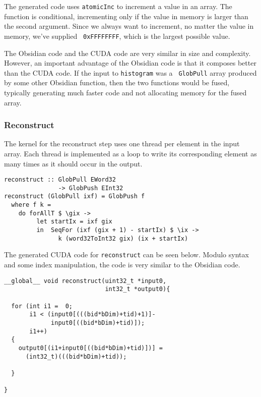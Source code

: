 The generated code uses \verb!atomicInc! to increment a value in an
array. The function is conditional, incrementing only if the value in
memory is larger than the second argument. Since we always want to
increment, no matter the value in memory, we've supplied {\tt
  0xFFFFFFFF}, which is the largest possible value.

The Obsidian code and the CUDA code are very similar in size and complexity. 
However, an important advantage of the Obsidian code is that it composes better
than the CUDA code. If the input to {\tt histogram} was a {\tt
  GlobPull} array produced by some other Obsidian function, then the
two functions would be fused, typically generating much faster code
and not allocating memory for the fused array.

\subsubsection{Reconstruct}

The kernel for the reconstruct step uses one thread per element in the
input array. Each thread is implemented as a loop to write its
corresponding element as many times as it should occur in the output.

\begin{small}
\begin{Verbatim}[samepage=true] 
reconstruct :: GlobPull EWord32 
               -> GlobPush EInt32
reconstruct (GlobPull ixf) = GlobPush f
  where f k = 
    do forAllT $ \gix ->
         let startIx = ixf gix 
         in  SeqFor (ixf (gix + 1) - startIx) $ \ix ->
               k (word32ToInt32 gix) (ix + startIx)
\end{Verbatim}
\end{small}

The generated CUDA code for \verb!reconstruct! can be seen
below. Modulo syntax and some index manipulation, the code is very
similar to the Obsidian code.

\begin{small}
\begin{Verbatim}[samepage=true]
__global__ void reconstruct(uint32_t *input0,
                            int32_t *output0){
  
  for (int i1 =  0;
       i1 < (input0[(((bid*bDim)+tid)+1)]-
             input0[((bid*bDim)+tid)]);
       i1++)
  {
    output0[(i1+input0[((bid*bDim)+tid)])] = 
      (int32_t)(((bid*bDim)+tid));
    
  }
  
}
\end{Verbatim}
\end{small}

